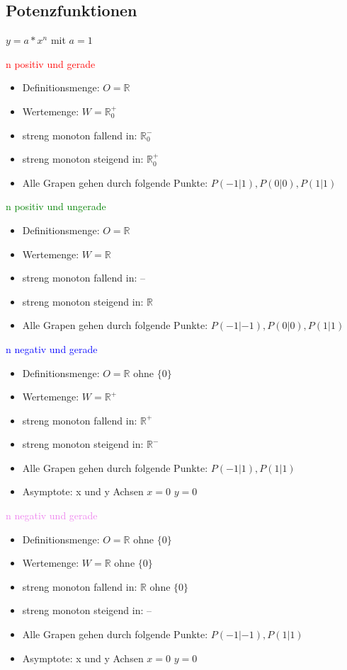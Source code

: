 \newpage
\subsection{Potenzfunktionen}

$y=a*x^n$ mit $a=1$


\hfill \break
\textcolor{red}{n positiv und gerade}
\begin{itemize}
    \item Definitionsmenge: $O = \mathbb{R}$
    \item Wertemenge: $W = \mathbb{R}_0^{+}$
    \item streng monoton fallend in: $\mathbb{R}_0^{-}$
    \item streng monoton steigend in: $\mathbb{R}_0^{+}$
    \item Alle Grapen gehen durch folgende Punkte: $P(-1|1),P(0|0),P(1|1)$
\end{itemize}

\hfill \break
\textcolor{green}{n positiv und ungerade}
\begin{itemize}
    \item Definitionsmenge: $O = \mathbb{R}$
    \item Wertemenge: $W = \mathbb{R}$
    \item streng monoton fallend in: --
    \item streng monoton steigend in: $\mathbb{R}$
    \item Alle Grapen gehen durch folgende Punkte: $P(-1|-1),P(0|0),P(1|1)$
\end{itemize}

\hfill \break
\textcolor{blue}{n negativ und gerade}
\begin{itemize}
    \item Definitionsmenge: $O = \mathbb{R}$ ohne $\{0\}$
    \item Wertemenge: $W = \mathbb{R}^{+}$
    \item streng monoton fallend in: $\mathbb{R}^{+}$
    \item streng monoton steigend in: $\mathbb{R}^{-}$
    \item Alle Grapen gehen durch folgende Punkte: $P(-1|1),P(1|1)$
    \item Asymptote: x und y Achsen $x=0$ $y=0$
\end{itemize}

\newpage
\textcolor{violet}{n negativ und gerade}
\begin{itemize}
    \item Definitionsmenge: $O = \mathbb{R}$ ohne $\{0\}$
    \item Wertemenge: $W = \mathbb{R}$ ohne $\{0\}$
    \item streng monoton fallend in: $\mathbb{R}$ ohne $\{0\}$
    \item streng monoton steigend in: --
    \item Alle Grapen gehen durch folgende Punkte: $P(-1|-1),P(1|1)$
    \item Asymptote: x und y Achsen $x=0$ $y=0$
\end{itemize}


